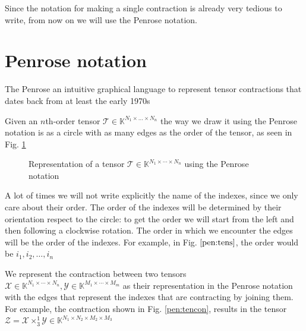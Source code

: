 \documentclass[11pt,a4paper,openright,oneside]{book}
\numberwithin{equation}{section}
\begin{document}
Since the notation for making a single contraction is already very tedious to write, from now on
we will use the Penrose notation.

\section{Penrose notation}
The Penrose an intuitive graphical language to represent tensor contractions that
dates back from at least the early 1970s \cite{rogerPenroseApplications}

Given an $n$th-order tensor $\mathcal{T} \in \mathbb{K}^{N_1 \times \dots \times N_n}$ the way we draw it using the
Penrose notation is as a circle with as many edges as the order of the tensor, as seen in Fig. \ref{pen:tens}

\begin{figure}[h]
\centering
{}
\caption{
    Representation of a tensor $\mathcal{T} \in \mathbb{K}^{N_1 \times \cdots \times N_n}$ using the Penrose notation
}
\label{pen:tens}
\end{figure}

A lot of times we will not write explicitly the name of the indexes, since we only care about their order. The order
of the indexes will be determined by their orientation respect to the circle: to get the order we will start from the left and then
following a clockwise rotation. The order in which we encounter the edges will be the order of the indexes. For example,
in Fig. $\ref{pen:tens}$, the order would be $i_1, i_2, \dots, i_n$

We represent the contraction between two tensors $\mathcal{X} \in \mathbb{K}^{N_1 \times \cdots \times N_n}, \mathcal{Y} \in \mathbb{K}^{M_1 \times \cdots \times M_m}$
as their representation in the Penrose notation with the edges that represent the indexes that are contracting by joining them. For example, the contraction
shown in Fig. \ref{pen:tencon}, results in the tensor $\mathcal{Z} = \mathcal{X} \times_3^1 \mathcal{Y} \in \mathbb{K}^{N_1 \times N_2 \times M_2 \times M_3}$
\end{document}
